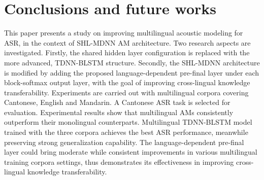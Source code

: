 \documentclass[a4paper]{article}
\begin{document}
\section{Conclusions and future works}
\label{sec:concl}
This paper presents a study on improving multilingual acoustic modeling for ASR, in the context of SHL-MDNN AM architecture. Two research aspects are investigated. Firstly, the shared hidden layer configuration is replaced  with the more advanced, TDNN-BLSTM structure. Secondly, the SHL-MDNN architecture is modified by adding the proposed language-dependent pre-final layer under each block-softmax output layer, with the goal of improving  cross-lingual knowledge transferability.
Experiments are carried out with multilingual corpora covering Cantonese, English and Mandarin. A Cantonese ASR task is selected for evaluation.
Experimental results show that multilingual AMs consistently outperform their monolingual counterparts. Multilingual TDNN-BLSTM model trained with the three corpora achieves the best ASR performance, meanwhile preserving strong generalization capability.
 The language-dependent pre-final layer could bring moderate while consistent improvements in various multilingual training corpora settings, thus demonstrates its effectiveness in improving
 cross-lingual knowledge transferability.

\end{document}
